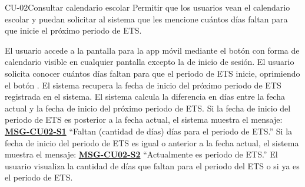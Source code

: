 
\label{CU-02}
\begin{UseCase}{CU-02}{Consultar calendario escolar}{
		Permitir que los usuarios vean el calendario escolar y puedan solicitar al sistema que les mencione cuántos días faltan para que inicie el próximo periodo de ETS.
	}
\end{UseCase}

\begin{UCtrayectoria}
	\UCpaso[\UCactor] El usuario accede a la pantalla  para la app móvil mediante el botón con forma de calendario visible en cualquier pantalla excepto la de inicio de sesión\label{CU02.accedePantalla}.
	\UCpaso[\UCactor] El usuario solicita conocer cuántos días faltan para que el periodo de ETS inicie, oprimiendo el botón .
	\UCpaso El sistema recupera la fecha de inicio del próximo periodo de ETS registrada en el sistema.
	\UCpaso El sistema calcula la diferencia en días entre la fecha actual y la fecha de inicio del próximo periodo de ETS.
	\UCpaso Si la fecha de inicio del periodo de ETS es posterior a la fecha actual, el sistema muestra el mensaje: \textbf{\hyperref[msg:CU02-S1]{MSG-CU02-S1}} ``Faltan (cantidad de días) días para el periodo de ETS.''
	\UCpaso Si la fecha de inicio del periodo de ETS es igual o anterior a la fecha actual, el sistema muestra el mensaje: \textbf{\hyperref[msg:CU02-S2]{MSG-CU02-S2}} ``Actualmente es periodo de ETS.''
	\UCpaso [\UCactor] El usuario visualiza la cantidad de días que faltan para el periodo del ETS o si ya es el periodo de ETS.
\end{UCtrayectoria}







